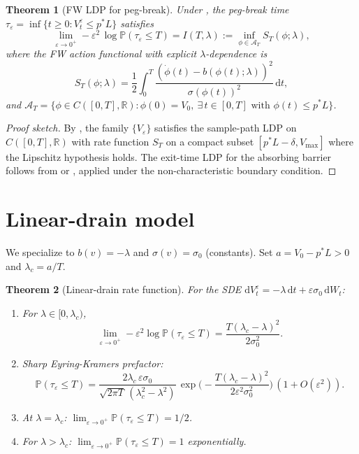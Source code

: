 \documentclass[11pt,a4paper]{article}
\theoremstyle{plain}
\newtheorem{theorem}{Theorem}[section]
\theoremstyle{definition}
\newcommand{\R}{\mathbb{R}}
\renewcommand{\P}{\mathbb{P}}
\newcommand{\eps}{\varepsilon}
\renewcommand{\d}{\mathrm{d}}
\begin{document}
\begin{theorem}[FW LDP for peg-break]\label{thm:LDP}
Under , the peg-break time $\tau_\eps = \inf\{t \geq 0 : V_t^\eps \leq p^*L\}$ satisfies
\begin{equation}
\lim_{\eps \to 0^+}-\eps^2\,\log\P(\tau_\eps \leq T) = I(T,\lambda) := \inf_{\phi \in \mathcal A_T} S_T(\phi;\lambda),
\end{equation}
where the FW action functional with explicit $\lambda$-dependence is
\begin{equation}
S_T(\phi;\lambda) = \frac{1}{2}\int_0^T \frac{(\dot\phi(t) - b(\phi(t);\lambda))^2}{\sigma(\phi(t))^2}\,\d t,
\end{equation}
and $\mathcal A_T = \{\phi \in C([0,T], \R) : \phi(0) = V_0,\ \exists\,t \in [0,T]\text{ with }\phi(t) \leq p^*L\}$.
\end{theorem}

\begin{proof}[Proof sketch]
By \cite[Theorem 5.6.3]{DemboZeitouni2010}, the family $\{V_\eps\}$ satisfies the sample-path LDP on $C([0,T], \R)$ with rate function $S_T$ on a compact subset $[p^*L - \delta, V_{\max}]$ where the Lipschitz hypothesis holds.
The exit-time LDP for the absorbing barrier follows from \cite[\S 5.7]{DemboZeitouni2010} or \cite[Ch. 4 \S 2 Thm 4.2.1]{FreidlinWentzell2012}, applied under the non-characteristic boundary condition.
\end{proof}

\section{Linear-drain model}
\label{sec:linear}

We specialize to $b(v) = -\lambda$ and $\sigma(v) = \sigma_0$ (constants). Set $a = V_0 - p^*L > 0$ and $\lambda_c = a/T$.

\begin{theorem}[Linear-drain rate function]\label{thm:linear}
For the SDE $\d V_t^\eps = -\lambda\,\d t + \eps\sigma_0\,\d W_t$:
\begin{enumerate}
\item For $\lambda \in [0, \lambda_c)$,
\begin{equation}
\lim_{\eps \to 0^+}-\eps^2\log\P(\tau_\eps \leq T) = \frac{T(\lambda_c - \lambda)^2}{2\sigma_0^2}.
\label{eq:linear-rate}
\end{equation}
\item Sharp Eyring-Kramers prefactor:
\begin{equation}
\P(\tau_\eps \leq T) = \frac{2\lambda_c\,\eps\sigma_0}{\sqrt{2\pi T}\,(\lambda_c^2 - \lambda^2)}\,\exp\!\Big(-\frac{T(\lambda_c-\lambda)^2}{2\eps^2\sigma_0^2}\Big)\,(1 + O(\eps^2)).
\end{equation}
\item At $\lambda = \lambda_c$: $\lim_{\eps \to 0^+}\P(\tau_\eps \leq T) = 1/2$.
\item For $\lambda > \lambda_c$: $\lim_{\eps \to 0^+}\P(\tau_\eps \leq T) = 1$ exponentially.
\end{enumerate}
\end{theorem}
\end{document}
